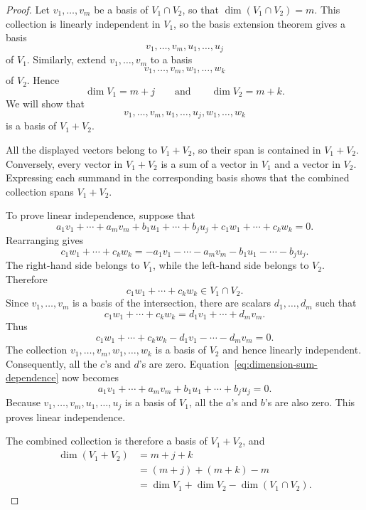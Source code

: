\begin{proof}
  Let $v_1,\ldots,v_m$ be a basis of $V_1\cap V_2$, so that
  $\dim(V_1\cap V_2)=m$. This collection is linearly independent in
  $V_1$, so the basis extension theorem gives a basis
  \[
    v_1,\ldots,v_m,u_1,\ldots,u_j
  \]
  of $V_1$. Similarly, extend $v_1,\ldots,v_m$ to a basis
  \[
    v_1,\ldots,v_m,w_1,\ldots,w_k
  \]
  of $V_2$. Hence
  \[
    \dim V_1=m+j
    \qquad\text{and}\qquad
    \dim V_2=m+k.
  \]
  We will show that
  \[
    v_1,\ldots,v_m,u_1,\ldots,u_j,w_1,\ldots,w_k
  \]
  is a basis of $V_1+V_2$.

  All the displayed vectors belong to $V_1+V_2$, so their span is
  contained in $V_1+V_2$. Conversely, every vector in $V_1+V_2$ is a
  sum of a vector in $V_1$ and a vector in $V_2$. Expressing each
  summand in the corresponding basis shows that the combined
  collection spans $V_1+V_2$.

  To prove linear independence, suppose that
  \begin{equation}\label{eq:dimension-sum-dependence}
    a_1v_1+\cdots+a_mv_m
    +b_1u_1+\cdots+b_ju_j
    +c_1w_1+\cdots+c_kw_k=0.
  \end{equation}
  Rearranging gives
  \[
    c_1w_1+\cdots+c_kw_k
    =-a_1v_1-\cdots-a_mv_m-b_1u_1-\cdots-b_ju_j.
  \]
  The right-hand side belongs to $V_1$, while the left-hand side
  belongs to $V_2$. Therefore
  \[
    c_1w_1+\cdots+c_kw_k\in V_1\cap V_2.
  \]
  Since $v_1,\ldots,v_m$ is a basis of the intersection, there are
  scalars $d_1,\ldots,d_m$ such that
  \[
    c_1w_1+\cdots+c_kw_k=d_1v_1+\cdots+d_mv_m.
  \]
  Thus
  \[
    c_1w_1+\cdots+c_kw_k-d_1v_1-\cdots-d_mv_m=0.
  \]
  The collection $v_1,\ldots,v_m,w_1,\ldots,w_k$ is a basis of $V_2$
  and hence linearly independent. Consequently, all the $c$'s and
  $d$'s are zero. Equation~\eqref{eq:dimension-sum-dependence} now
  becomes
  \[
    a_1v_1+\cdots+a_mv_m+b_1u_1+\cdots+b_ju_j=0.
  \]
  Because $v_1,\ldots,v_m,u_1,\ldots,u_j$ is a basis of $V_1$, all
  the $a$'s and $b$'s are also zero. This proves linear independence.

  The combined collection is therefore a basis of $V_1+V_2$, and
  \begin{align*}
    \dim(V_1+V_2)
      &=m+j+k \\
      &=(m+j)+(m+k)-m \\
      &=\dim V_1+\dim V_2-\dim(V_1\cap V_2).
  \end{align*}
\end{proof}

